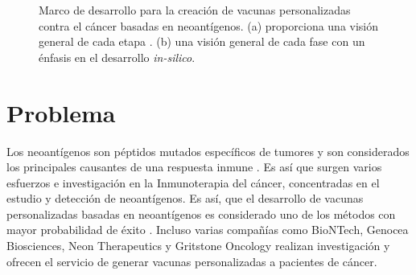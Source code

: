 \begin{figure}[h]
	\centering
	
	\caption[\textit{Pipeline} para el desarrollo de vacunas basadas en neoantígenos]{Marco de desarrollo para la creación de vacunas personalizadas contra el cáncer basadas en neoantígenos. (a) proporciona una visión general de cada etapa \citep{han2020progress}. (b) una visión general de cada fase con un énfasis en el desarrollo \textit{in-silico}.}
	\label{fig:vaccines}
\end{figure}

\section{Problema}
\label{sec:problema}

Los neoantígenos son péptidos mutados específicos de tumores y son considerados los principales causantes de una respuesta inmune \citep{borden2022cancer, chen2021challenges, gopanenko2020main}. Es así que surgen varios esfuerzos e investigación en la Inmunoterapia del cáncer, concentradas en el estudio y detección de neoantígenos. Es así, que el desarrollo de vacunas personalizadas basadas en neoantígenos es considerado uno de los métodos con mayor probabilidad de éxito \citep{borden2022cancer}. Incluso varias compañías como BioNTech, Genocea Biosciences, Neon Therapeutics y Gritstone Oncology realizan investigación y ofrecen el servicio de generar vacunas personalizadas a pacientes de cáncer.

